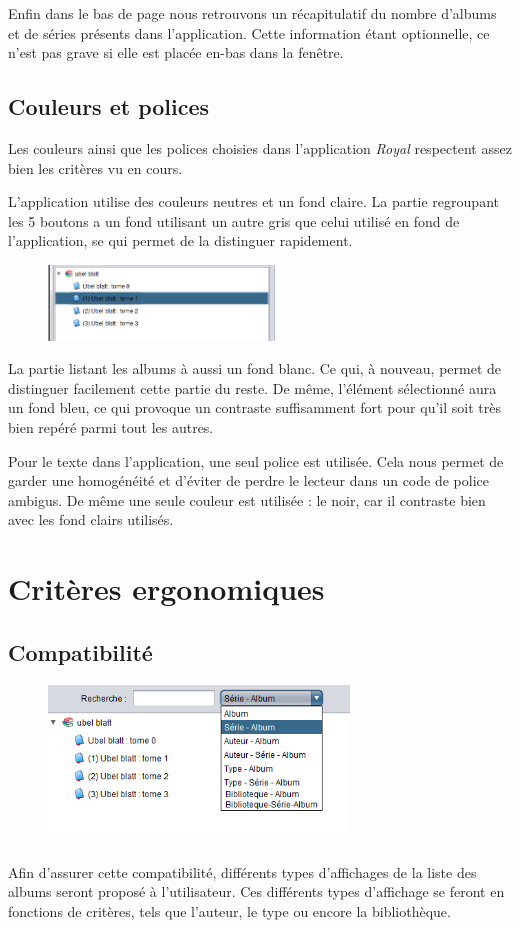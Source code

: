 \documentclass[etudiants]{support-iutrs}
\begin{document}
Enfin dans le bas de page nous retrouvons un récapitulatif du nombre d'albums et de séries présents dans l'application.
Cette information étant optionnelle, ce n'est pas grave si elle est placée en-bas dans la fenêtre.

\subsection{Couleurs et polices}
Les couleurs ainsi que les polices choisies dans l'application \emph{Royal} respectent assez bien les critères vu en cours.

L'application utilise des couleurs neutres et un fond claire. 
La partie regroupant les 5 boutons a un fond utilisant un autre gris que celui utilisé en fond de l'application, se qui permet de la distinguer rapidement. 
\begin{figure}
\includegraphics[width=6cm]{img/app_pc_maquette_elmt_selec.png}
\end{figure}

La partie listant les albums à aussi un fond blanc. Ce qui, à nouveau, permet de distinguer facilement cette partie du reste. 
De même, l'élément sélectionné aura un fond bleu, ce qui provoque un contraste suffisamment fort pour qu'il soit très bien repéré parmi tout les autres.  

Pour le texte dans l'application, une seul police est utilisée. 
Cela nous permet de garder une homogénéité et d'éviter de perdre le lecteur dans un code de police ambigus.
De même une seule couleur est utilisée : le noir, car il contraste bien avec les fond clairs utilisés.  

\section{Critères ergonomiques}
\subsection{Compatibilité} 

\begin{figure}
\includegraphics[width=8cm]{img/app_pc_maquette_lst.png}
\end{figure}\subparagraph{}
Afin d'assurer cette compatibilité, différents types d'affichages de la liste des albums seront proposé à l'utilisateur.
Ces différents types d'affichage se feront en fonctions de critères, tels que l'auteur, le type ou encore la bibliothèque.
\end{document}
